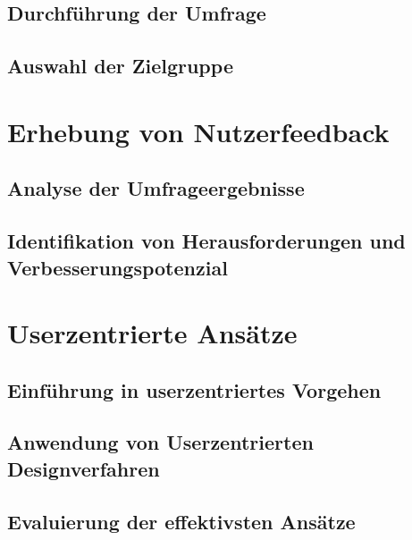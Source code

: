 \subsection{Durchführung der Umfrage}

\subsection{Auswahl der Zielgruppe}

\section{Erhebung von Nutzerfeedback}

\subsection{Analyse der Umfrageergebnisse}

\subsection{Identifikation von Herausforderungen und Verbesserungspotenzial}

\section{Userzentrierte Ansätze}

\subsection{Einführung in userzentriertes Vorgehen}

\subsection{Anwendung von Userzentrierten Designverfahren}

\subsection{Evaluierung der effektivsten Ansätze}

